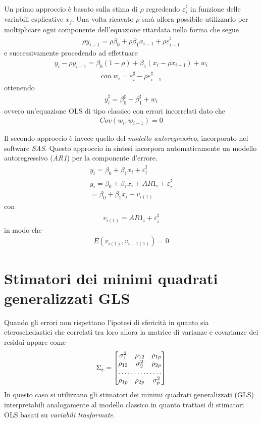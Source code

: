 \documentclass[11pt, twocolumn]{article}
\begin{document}
Un primo approccio è basato sulla stima di $\rho$ regredendo $\varepsilon_i^\sharp$ in funzione delle variabili esplicative $x_j$. Una volta ricavato $\rho$ sarà allora possibile utilizzarlo per moltiplicare ogni componente dell'equazione ritardata nella forma che segue
\begin{align*}
\rho y_{i-1} = \rho\beta_0 + \rho\beta_1 x_{i-1} + \rho\varepsilon_{i-1}^\sharp
\end{align*}
e successivamente procedendo ad effettuare
\begin{align*}
y_i - \rho y_{i-1} = \beta_0(1-\rho) + \beta_1(x_i-\rho x_{i-1}) + w_i
\end{align*}
\begin{align*}
con \  w_i = \varepsilon_i^\sharp - \rho\varepsilon_{i-1}^\sharp
\end{align*} 
ottenendo
\begin{align*}
y_i^\sharp = \beta_0^\sharp + \beta_1^\sharp + w_i
\end{align*}
ovvero un'equazione OLS di tipo classico con errori incorrelati dato che
\begin{align*}
Cov(w_i;w_{i-1}) = 0
\end{align*}

Il secondo approccio è invece quello del \textit{modello autoregressivo}, incorporato nel software \textit{SAS}.
Questo approccio in sintesi incorpora automaticamente un modello autoregressivo (\textit{AR1}) per la componente d'errore.
\begin{align*}
y_t = \beta_0 + \beta_1 x_i + \varepsilon_t^\sharp \\
y_i = \beta_0 + \beta_1 x_i + AR1_i + \varepsilon_i^\sharp \\ 
= \beta_0 + \beta_1 x_i + v_{i(1)}
\end{align*}
con
\begin{align*}
v_{i(1)} = AR1_i + \varepsilon_i^\sharp
\end{align*}
in modo che
\begin{align*}
E(v_{i(1)},v_{i-1(1)}) = 0
\end{align*}
\section{Stimatori dei minimi quadrati generalizzati GLS}
Quando gli errori non rispettano l'ipotesi di sfericità in quanto sia eteroschedastici che correlati tra loro allora la matrice di varianze e covarianze dei residui appare come
\[
\Sigma_\varepsilon = 
\begin{bmatrix}
\sigma_1^2 & \rho_{12} & \rho_{1p} \\
\rho_{12} & \sigma_2^2 & \rho_{2p} \\
\hdotsfor{3} \\
\rho_{1p} & \rho_{2p} & \sigma_p^2
\end{bmatrix}
\]
In questo caso si utilizzano gli stimatori dei minimi quadrati generalizzati (GLS) interpretabili analogamente al modello classico in quanto trattasi di stimatori OLS basati su \textit{variabili trasformate}.
\end{document}
